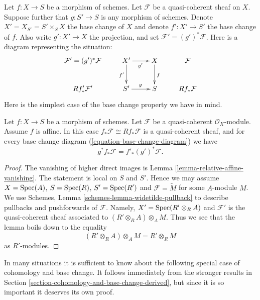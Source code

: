 \noindent
Let $f : X \to S$ be a morphism of schemes.
Let $\mathcal{F}$ be a quasi-coherent sheaf on $X$.
Suppose further that $g : S' \to S$ is any morphism of schemes. Denote
$X' = X_{S'} = S' \times_S X$ the base change of $X$ and denote
$f' : X' \to S'$ the base change of $f$.
Also write $g' : X' \to X$ the projection,
and set $\mathcal{F}' = (g')^*\mathcal{F}$.
Here is a diagram representing the situation:
\begin{equation}
\label{equation-base-change-diagram}
\vcenter{
\xymatrix{
\mathcal{F}' = (g')^*\mathcal{F} &
X' \ar[r]_{g'} \ar[d]_{f'} &
X \ar[d]^f &
\mathcal{F} \\
Rf'_*\mathcal{F}' &
S' \ar[r]^g &
S &
Rf_*\mathcal{F}
}
}
\end{equation}
Here is the simplest case of the base change property we have in mind.

\begin{lemma}
\label{lemma-affine-base-change}
Let $f : X \to S$ be a morphism of schemes.
Let $\mathcal{F}$ be a quasi-coherent $\mathcal{O}_X$-module.
Assume $f$ is affine.
In this case $f_*\mathcal{F} \cong Rf_*\mathcal{F}$ is
a quasi-coherent sheaf, and for every base change diagram
(\ref{equation-base-change-diagram})
we have
$$
g^*f_*\mathcal{F} = f'_*(g')^*\mathcal{F}.
$$
\end{lemma}

\begin{proof}
The vanishing of higher direct images is
Lemma \ref{lemma-relative-affine-vanishing}.
The statement is local on $S$ and $S'$. Hence we may
assume $X = \mathop{\mathrm{Spec}}(A)$, $S = \mathop{\mathrm{Spec}}(R)$,
$S' = \mathop{\mathrm{Spec}}(R')$ and $\mathcal{F} = \widetilde{M}$
for some $A$-module $M$.
We use Schemes, Lemma \ref{schemes-lemma-widetilde-pullback}
to describe pullbacks and pushforwards of $\mathcal{F}$.
Namely, $X' = \mathop{\mathrm{Spec}}(R' \otimes_R A)$ and
$\mathcal{F}'$ is the quasi-coherent sheaf associated
to $(R' \otimes_R A) \otimes_A M$.
Thus we see that the lemma boils down to the
equality
$$
(R' \otimes_R A) \otimes_A M = R' \otimes_R M
$$
as $R'$-modules.
\end{proof}

\noindent
In many situations it is sufficient to know about the following
special case of cohomology and base change. It follows immediately
from the stronger results in
Section \ref{section-cohomology-and-base-change-derived},
but since it is so important it deserves its own proof.

